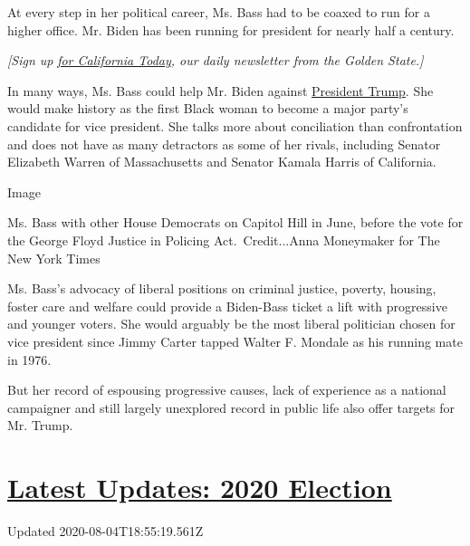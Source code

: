 At every step in her political career, Ms. Bass had to be coaxed to run
for a higher office. Mr. Biden has been running for president for nearly
half a century.

\emph{{[}Sign up}
\href{https://www.nytimes.com/newsletters/california-today}{\emph{for
California Today}}\emph{, our daily newsletter from the Golden
State.{]}}

In many ways, Ms. Bass could help Mr. Biden against
\href{https://www.nytimes.com/interactive/2020/us/elections/donald-trump.html}{President
Trump}. She would make history as the first Black woman to become a
major party's candidate for vice president. She talks more about
conciliation than confrontation and does not have as many detractors as
some of her rivals, including Senator Elizabeth Warren of Massachusetts
and Senator Kamala Harris of California.

Image

Ms. Bass with other House Democrats on Capitol Hill in June, before the
vote for the George Floyd Justice in Policing Act.~Credit...Anna
Moneymaker for The New York Times

Ms. Bass's advocacy of liberal positions on criminal justice, poverty,
housing, foster care and welfare could provide a Biden-Bass ticket a
lift with progressive and younger voters. She would arguably be the most
liberal politician chosen for vice president since Jimmy Carter tapped
Walter F. Mondale as his running mate in 1976.

But her record of espousing progressive causes, lack of experience as a
national campaigner and still largely unexplored record in public life
also offer targets for Mr. Trump.

\hypertarget{latest-updates-2020-election}{%
\section{\texorpdfstring{\href{https://www.nytimes.com/2020/08/04/us/elections/primary-election-michigan-arizona-kansas.html?action=click\&pgtype=Article\&state=default\&region=MAIN_CONTENT_1\&context=storylines_live_updates}{Latest
Updates: 2020
Election}}{Latest Updates: 2020 Election}}\label{latest-updates-2020-election}}

Updated 2020-08-04T18:55:19.561Z


